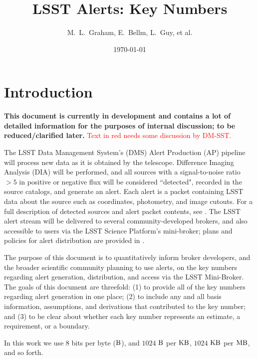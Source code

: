 \documentclass[DM,authoryear,toc]{lsstdoc}
\title[Alerts Key Numbers]{LSST Alerts: Key Numbers}
\author{%
M.~L.~Graham, E.~Bellm, L.~Guy, et al.
}
\date{\today}
\begin{document}
\maketitle

\section{Introduction} \label{sec:intro}

{\bf This document is currently in development and contains a lot of detailed information for the purposes of internal discussion; to be reduced/clarified later.} \textcolor{red}{Text in red needs some discussion by DM-SST.}

The LSST Data Management System's (DMS) Alert Production (AP) pipeline will process new data as it is obtained by the telescope. Difference Imaging Analysis (DIA) will be performed, and all sources with a signal-to-noise ratio $>5$ in positive or negative flux will be considered ``detected", recorded in the source catalogs, and generate an alert. Each alert is a packet containing LSST data about the source such as coordinates, photometry, and image cutouts. For a full description of detected sources and alert packet contents, see . The LSST alert stream will be delivered to several community-developed brokers, and also accessible to users via the LSST Science Platform's mini-broker; plans and policies for alert distribution are provided in . 

The purpose of this document is to quantitatively inform broker developers, and the broader scientific community planning to use alerts, on the key numbers regarding alert generation, distribution, and access via the LSST Mini-Broker. The goals of this document are threefold: (1) to provide all of the key numbers regarding alert generation in one place; (2) to include any and all basis information, assumptions, and derivations that contributed to the key number; and (3) to be clear about whether each key number represents an estimate, a requirement, or a boundary. 

In this work we use 8 bits per byte ($\rm B$), and $1024$ $\rm B$ per $\rm KB$, $1024$ $\rm KB$ per $\rm MB$, and so forth.
\end{document}

